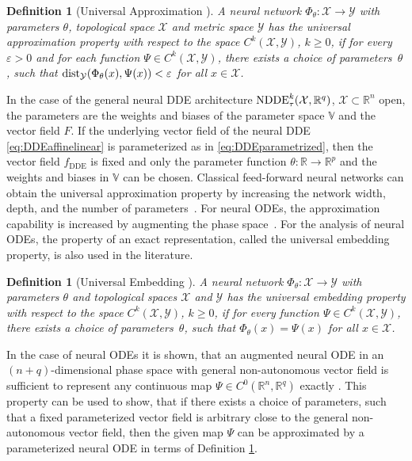 \documentclass[10pt]{article}
\numberwithin{equation}{section}
\newtheorem{definition}[theorem]{Definition}
\begin{document}
	\begin{definition}[Universal Approximation \cite{Kratsios2021}] \label{def:universalapproximation}
		A neural network $\Phi_\theta: \mathcal{X} \rightarrow \mathcal{Y}$ with parameters $\theta$, topological space $\mathcal{X}$ and metric space $\mathcal{Y}$ has the universal approximation property with respect to the space $C^k(\mathcal{X},\mathcal{Y})$, $k \geq 0$, if for every $\varepsilon >0$ and for each function $\Psi \in C^k(\mathcal{X},\mathcal{Y})$, there exists a choice of parameters~$\theta$, such that $\textup{dist}_\mathcal{Y}(\Phi_\theta(x),\Psi(x)) < \varepsilon$ for all $x \in \mathcal{X}$.
	\end{definition}
	
	In the case of the general neural DDE architecture $\textup{NDDE}_\tau^k(\mathcal{X},\mathbb{R}^q)$, $\mathcal{X}\subset \mathbb{R}^n$ open, the parameters are the weights and biases of the parameter space $\mathbb{V}$ and the vector field $F$. If the underlying vector field of the neural DDE \eqref{eq:DDEaffinelinear} is parameterized as in \eqref{eq:DDEparametrized}, then the vector field $f_\text{DDE}$ is fixed and only the parameter function $\theta:\mathbb{R}\rightarrow \mathbb{R}^{p}$ and the weights and biases in $\mathbb{V}$ can be chosen. Classical feed-forward neural networks can obtain the universal approximation property by increasing the network width, depth, and the number of parameters~\cite{Hornik1989, Lin2018, Pinkus1999, Schaefer2006}. For neural ODEs, the approximation capability is increased by augmenting the phase space~\cite{Dupont2019,Kidger2022,Kuehn2023,Zhang2020a}. For the analysis of neural ODEs, the property of an exact representation, called the universal embedding property, is also used in the literature.	
	
	\begin{definition}[Universal Embedding \cite{Kuehn2023}]\label{def:universalembedding}
		A neural network $\Phi_\theta: \mathcal{X} \rightarrow \mathcal{Y}$ with parameters $\theta$ and topological spaces $\mathcal{X}$ and $\mathcal{Y}$ has the universal embedding property with respect to the space $C^k(\mathcal{X},\mathcal{Y})$, $k \geq 0$, if for every function $ \Psi \in C^k(\mathcal{X},\mathcal{Y})$, there exists a choice of parameters~$\theta$, such that $\Phi_\theta(x) = \Psi(x)$ for all $x \in \mathcal{X}$.
	\end{definition}
	
	In the case of neural ODEs it is shown, that an augmented neural ODE in an $(n+q)$-dimensional phase space with general non-autonomous vector field is sufficient to represent any continuous map $\Psi\in C^0(\mathbb{R}^n,\mathbb{R}^q)$ exactly \cite{Kuehn2023}. This property can be used to show, that if there exists a choice of parameters, such that a fixed parameterized vector field is arbitrary close to the general non-autonomous vector field, then the given map $\Psi$ can be approximated by a parameterized neural ODE in terms of Definition \ref{def:universalapproximation}. 
	
\end{document}
